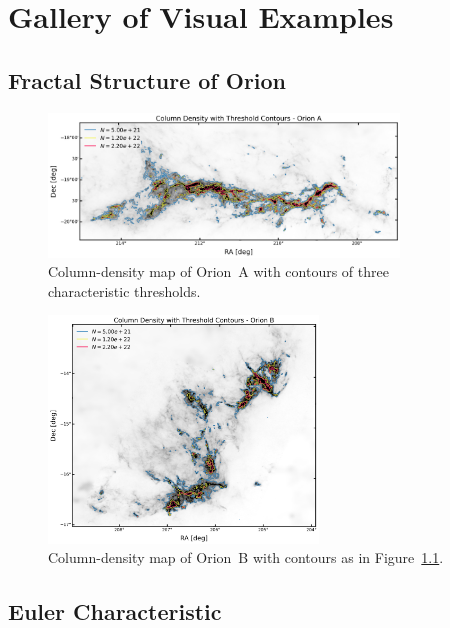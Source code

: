 \chapter{Gallery of Visual Examples}
\label{appendix:gallery}

\section{Fractal Structure of Orion}

\begin{figure}[h]
    \centering
    \includegraphics[width=0.83\textwidth]{figures/Orion_A_gallery_global.png}
    \caption{Column-density map of Orion~A with contours of three characteristic thresholds.}
    \label{fig:gallery_global_thresholds_OA}
\end{figure}

\begin{figure}[h]
    \centering
    \includegraphics[width=0.64\textwidth]{figures/Orion_B_gallery_global.png}
    \caption{Column-density map of Orion~B with contours as in Figure~\ref{fig:gallery_global_thresholds_OA}.}
    \label{fig:gallery_global_thresholds_OB}
\end{figure}

\section{Euler Characteristic}

